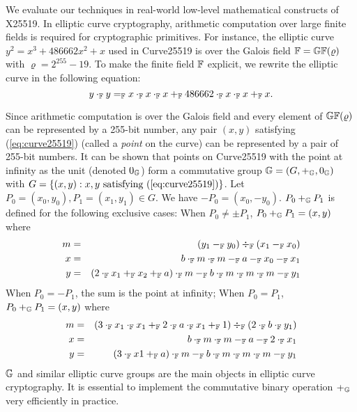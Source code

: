 
We evaluate our techniques in real-world low-level mathematical
constructs of X25519. 
In elliptic curve cryptography, arithmetic computation over
large finite fields is required for cryptographic primitives. For
instance, the elliptic curve $y^2 = x^3 + 486662 x^2 + x$ used in 
Curve25519 is over the Galois field $\mathbb{F} = \mathbb{GF}(\varrho)$ with
$\varrho = 2^{255} - 19$. To
make the finite field $\mathbb{F}$ explicit, we rewrite the elliptic
curve in the following equation: 
\begin{equation}
  \label{eq:curve25519}
  y \cdot_{\mathbb{F}} y =_{\mathbb{F}} x \cdot_{\mathbb{F}} x \cdot_{\mathbb{F}} x +_{\mathbb{F}}
  486662 \cdot_{\mathbb{F}} x \cdot_{\mathbb{F}} x +_{\mathbb{F}} x.
\end{equation}

Since arithmetic computation is over the Galois field and every
element of $\mathbb{GF}(\varrho)$ can be represented by a 255-bit number,
any pair $(x, y)$ satisfying (\ref{eq:curve25519}) (called a
\emph{point} on the curve) can be represented by a pair of 255-bit
numbers. It can be shown that points on Curve25519 with the point at
infinity as the unit (denoted $0_{\mathbb{G}}$) form a commutative group $\mathbb{G} = (G, +_{\mathbb{G}}, 0_{\mathbb{G}})$
with $G = \{ (x, y) : x, y \textmd{ satisfying } (\ref{eq:curve25519})
\}$. Let $P_0 = (x_0, y_0), P_1 = (x_1, y_1) \in G$. We have $-P_0 =
(x_0, -y_0)$. $P_0 +_{\mathbb{G}} P_1$ is defined for the following exclusive
cases: When $P_0 \neq \pm P_1$, $P_0 +_{\mathbb{G}} P_1 = (x, y)$ where
\begin{eqnarray}
  m & = & (y_1 \Fminus y_0) \Fdiv (x_1 \Fminus x_0)\\\nonumber
  x & = & b \Ftimes m \Ftimes m \Fminus a \Fminus x_0 \Fminus x_1\\ \nonumber
  y & = & %
          (2 \Ftimes x_1 \Fplus x_2 \Fplus a )\Ftimes m
          \Fminus b \Ftimes m \Ftimes m \Ftimes m\Fminus y_1
  \label{eq:curve25519-group}
\end{eqnarray}
When $P_0=-P_1$, the sum is the point at infinity; When $P_0= P_1$,
$P_0 +_{\mathbb{G}} P_1 = (x, y)$ where
\begin{eqnarray}
  \label{eq:curve25519-dbl}
  m &=& (3  \cdot_{\mathbb{F}} x_1 \cdot_{\mathbb{F}} x_1 +_{\mathbb{F}} 2\cdot_{\mathbb{F}} a\cdot_{\mathbb{F}} x_1+_{\mathbb{F}} 1) 
        \div_{\mathbb{F}} (2\cdot_{\mathbb{F}} b\cdot_{\mathbb{F}} y_1) \\ \nonumber
   x &=& b \cdot_{\mathbb{F}} m \cdot_{\mathbb{F}} m -_{\mathbb{F}} a -_{\mathbb{F}} 2 \cdot_{\mathbb{F}} x_1 \\ \nonumber
   y &=& (3 \cdot_{\mathbb{F}} x1+_{\mathbb{F}} a) \cdot_{\mathbb{F}} m -_{\mathbb{F}} b \cdot_{\mathbb{F}} m \cdot_{\mathbb{F}} m \cdot_{\mathbb{F}} m-_{\mathbb{F}} y_1
\end{eqnarray}
%
$\mathbb{G}$ and similar elliptic curve groups
are the main objects in elliptic curve cryptography. It is
essential to implement the commutative binary operation $+_{\mathbb{G}}$ very
efficiently in practice.

